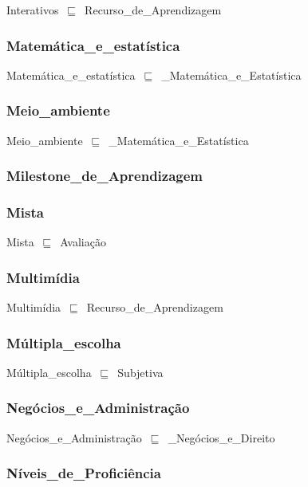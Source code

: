 \documentclass{article}
\begin{document}
Interativos~\ensuremath{\sqsubseteq}~Recurso\_de\_Aprendizagem~

\subsubsection*{Matemática\_e\_estatística}

Matemática\_e\_estatística~\ensuremath{\sqsubseteq}~\_Matemática\_e\_Estatística~

\subsubsection*{Meio\_ambiente}

Meio\_ambiente~\ensuremath{\sqsubseteq}~\_Matemática\_e\_Estatística~

\subsubsection*{Milestone\_de\_Aprendizagem}

\subsubsection*{Mista}

Mista~\ensuremath{\sqsubseteq}~Avaliação~

\subsubsection*{Multimídia}

Multimídia~\ensuremath{\sqsubseteq}~Recurso\_de\_Aprendizagem~

\subsubsection*{Múltipla\_escolha}

Múltipla\_escolha~\ensuremath{\sqsubseteq}~Subjetiva~

\subsubsection*{Negócios\_e\_Administração}

Negócios\_e\_Administração~\ensuremath{\sqsubseteq}~\_Negócios\_e\_Direito~

\subsubsection*{Níveis\_de\_Proficiência}
\end{document}
